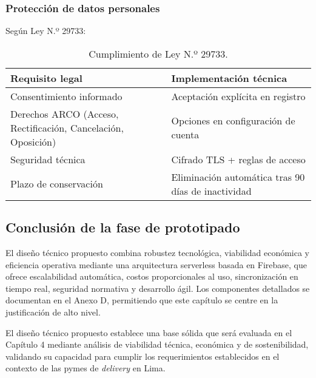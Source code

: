 \subsubsection{Protección de datos personales}

Según Ley N.º 29733:

\begin{table}[H]
\centering
\caption{Cumplimiento de Ley N.º 29733.}
\label{tab:cumplimiento_ley}
\begin{tabular}{@{}p{5.5cm}p{7.5cm}@{}}
\toprule
\textbf{Requisito legal} & \textbf{Implementación técnica} \\
\midrule
Consentimiento informado & Aceptación explícita en registro \\
\midrule
Derechos ARCO (Acceso, Rectificación, Cancelación, Oposición) & Opciones en configuración de cuenta \\
\midrule
Seguridad técnica & Cifrado TLS + reglas de acceso \\
\midrule
Plazo de conservación & Eliminación automática tras 90 días de inactividad \\
\bottomrule
\end{tabular}
\end{table}

\subsection{Conclusión de la fase de prototipado}

El diseño técnico propuesto combina robustez tecnológica, viabilidad económica y eficiencia operativa mediante una arquitectura serverless basada en Firebase, que ofrece escalabilidad automática, costos proporcionales al uso, sincronización en tiempo real, seguridad normativa y desarrollo ágil. Los componentes detallados se documentan en el Anexo D, permitiendo que este capítulo se centre en la justificación de alto nivel.

El diseño técnico propuesto establece una base sólida que será evaluada en el Capítulo 4 mediante análisis de viabilidad técnica, económica y de sostenibilidad, validando su capacidad para cumplir los requerimientos establecidos en el contexto de las pymes de \textit{delivery} en Lima.